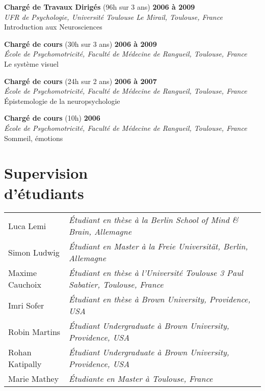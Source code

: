 \documentclass[margin,line]{resume}
\begin{document}
\begin{resume}
	\vspace{-2mm} 
	\textbf{Chargé de Travaux Dirigés} (96h sur 3 ans) \hfill \textbf{2006 à 2009}\\
	\textsl{UFR de Psychologie, Université Toulouse Le Mirail, Toulouse, France}\\
	Introduction aux Neurosciences	

	\vspace{-2mm} 
	\textbf{Chargé de cours} (30h sur 3 ans) \hfill \textbf{2006 à 2009}\\
	\textsl{\'Ecole de Psychomotricité, Faculté de Médecine de Rangueil, Toulouse, France}\\
	Le système visuel 
	
	\vspace{-2mm} 
	\textbf{Chargé de cours} (24h sur 2 ans) \hfill \textbf{2006 à 2007}\\
	\textsl{\'Ecole de Psychomotricité, Faculté de Médecine de Rangueil, Toulouse, France}\\
	\'Epistemologie de la neuropsychologie

	\vspace{-2mm} 
	\textbf{Chargé de cours} (10h) \hfill \textbf{2006}\\
	\textsl{\'Ecole de Psychomotricité, Faculté de Médecine de Rangueil, Toulouse, France}\\
	Sommeil, émotions


\vspace{3mm}
\section{\mysidestyle Supervision\\d'étudiants}
	
	\begin{tabular}{@{}ll} %
	Luca Lemi       & \textsl{\'Etudiant en thèse à la Berlin School of Mind \& Brain, Allemagne}\\
	Simon Ludwig    & \textsl{\'Etudiant en Master à la Freie Universität, Berlin, Allemagne}\\
	Maxime Cauchoix & \textsl{\'Etudiant en thèse à l'Université Toulouse 3 Paul Sabatier, Toulouse, France}\\
	Imri Sofer      & \textsl{\'Etudiant en thèse à Brown University, Providence, USA}\\
	Robin Martins   & \textsl{\'Etudiant Undergraduate à Brown University, Providence, USA} \\
	Rohan Katipally & \textsl{\'Etudiant Undergraduate à Brown University, Providence, USA} \\
	Marie Mathey    & \textsl{\'Etudiante en Master à Toulouse, France}
	\end{tabular}
	



\end{resume}
\end{document}
